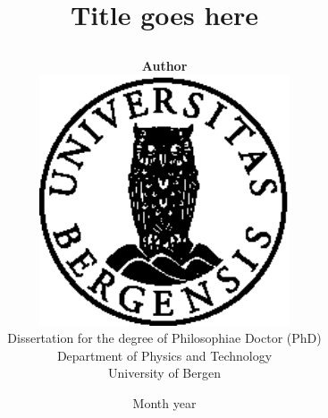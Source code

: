 \documentclass[10pt]{book}
\title{
{\fontsize{28}{30}\usefont{OT1}{phv}{bc}{n}\selectfont Title goes here}
	\author{
	\textbf{Author}\vspace{3cm}\\
		\includegraphics[width=74mm]{figurer/uglo}\vspace{1em}\\
		Dissertation for the degree of Philosophiae Doctor (PhD)\vspace{3.5em}\\
		Department of Physics and Technology \\
		University of Bergen
	}
	\date{Month year}
}
\begin{document}

\ifDownscaledFinalDoc
	\fontsize{\TextSize}{\BaseLineSkip}
	\selectfont
\fi

\ifDraft
	\doublespacing
\fi


\maketitle
\frontmatter




\tableofcontents
\listoffigures
\lstlistoflistings

\mainmatter

%
%

%
%
\appendix


\backmatter

%
%

%
%
%

%
%



\end{document}
